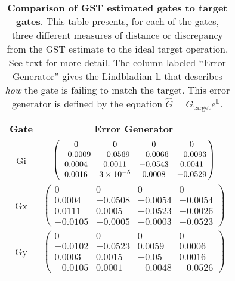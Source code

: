 {\begin{table}[h]
\begin{center}
\vspace{2em}
\begin{tabular}[l]{|c|c|}
\hline
Gate & Error Generator \\ \hline
Gi & $ \left(\!\!\begin{array}{cccc}
0 & 0 & 0 & 0 \\ 
-0.0009 & -0.0569 & -0.0066 & -0.0093 \\ 
0.0004 & 0.0011 & -0.0543 & 0.0041 \\ 
0.0016 & 3\times 10^{-5} & 0.0008 & -0.0529
 \end{array}\!\!\right) $
 \\ \hline
Gx & $ \left(\!\!\begin{array}{cccc}
0 & 0 & 0 & 0 \\ 
0.0004 & -0.0508 & -0.0054 & -0.0054 \\ 
0.0111 & 0.0005 & -0.0523 & -0.0026 \\ 
-0.0105 & -0.0005 & -0.0003 & -0.0523
 \end{array}\!\!\right) $
 \\ \hline
Gy & $ \left(\!\!\begin{array}{cccc}
0 & 0 & 0 & 0 \\ 
-0.0102 & -0.0523 & 0.0059 & 0.0006 \\ 
0.0003 & 0.0015 & -0.05 & 0.0016 \\ 
-0.0105 & 0.0001 & -0.0048 & -0.0526
 \end{array}\!\!\right) $
 \\ \hline
\end{tabular}

\caption{\textbf{Comparison of GST estimated gates to target gates}.  This table presents, for each of the gates, three different measures of distance or discrepancy from the GST estimate to the ideal target operation.  See text for more detail.  The column labeled ``Error Generator'' gives the Lindbladian $\mathbb{L}$ that describes \emph{how} the gate is failing to match the target.  This error generator is defined by the equation $\hat{G} = G_{\mathrm{target}}e^{\mathbb{L}}$. \label{bestCPTPGatesetVsTargetTable}}
\end{center}
\end{table}

}
